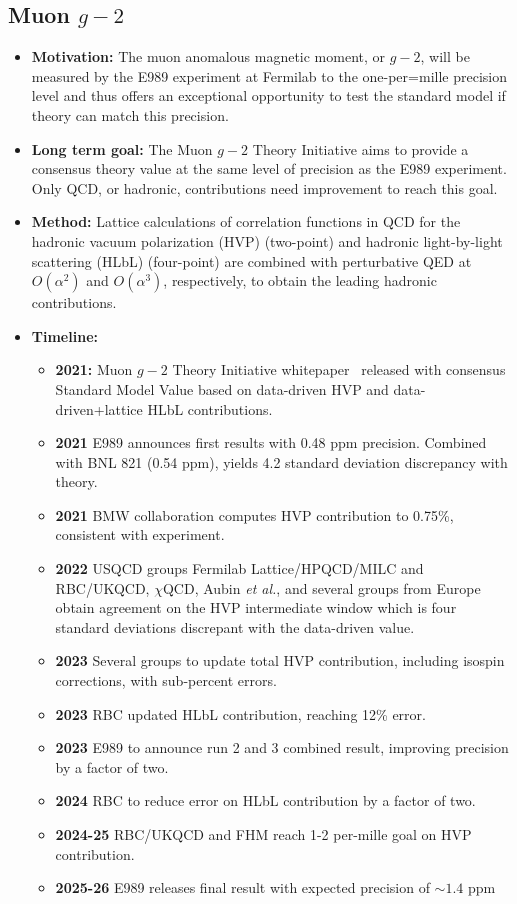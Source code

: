 \documentclass[12pt,hyperpdf]{article}
\begin{document}
\subsection{Muon $g-2$}
\begin{itemize}
    \item{\bf Motivation:} The muon anomalous magnetic moment, or
      $g-2$, will be measured by the E989 experiment at Fermilab to
      the one-per=mille precision level and thus offers an exceptional
      opportunity to test the standard model if theory can match this
      precision. 
    \item{\bf Long term goal:} The Muon $g-2$ Theory Initiative aims
      to provide a consensus theory value at the same level of
      precision as the E989 experiment. Only QCD, or hadronic,
      contributions need improvement to reach this goal.      
    \item{\bf Method:} Lattice  calculations of correlation functions
      in QCD for the hadronic vacuum polarization (HVP) (two-point)
      and hadronic light-by-light scattering (HLbL) (four-point) are
      combined with perturbative QED at $O(\alpha^2)$ and
      $O(\alpha^3)$, respectively, to obtain the leading hadronic
      contributions.  
\item{\bf Timeline:}
\begin{itemize}
    \item{\bf 2021:} Muon $g-2$ Theory Initiative whitepaper~\cite{Aoyama:2020ynm} released with consensus Standard Model Value based on data-driven HVP and data-driven+lattice HLbL contributions.
    \item{\bf 2021} E989 announces first results with 0.48 ppm precision. Combined with BNL 821 (0.54 ppm), yields 4.2 standard deviation discrepancy with theory.
    \item{\bf 2021} BMW collaboration computes HVP contribution to 0.75\%, consistent with experiment. 
    \item{\bf 2022} USQCD groups Fermilab Lattice/HPQCD/MILC and RBC/UKQCD, $\chi$QCD, Aubin {\it et al.}, and several groups from Europe obtain agreement on the HVP intermediate window which is four standard deviations discrepant with the data-driven value.
    \item{\bf 2023} Several groups to update total HVP contribution, including isospin corrections, with sub-percent errors.
    \item{\bf 2023} RBC updated HLbL contribution, reaching 12\% error.
    \item{\bf 2023} E989 to announce run 2 and 3 combined result, improving precision by a factor of two.
    \item{\bf 2024} RBC to reduce error on HLbL contribution by a factor of two.
    \item{\bf 2024-25} RBC/UKQCD and FHM reach 1-2 per-mille goal on HVP contribution. 
    \item{\bf 2025-26} E989 releases final result with expected precision of $\sim 1.4$ ppm
\end{itemize}
\end{itemize}
\end{document}
